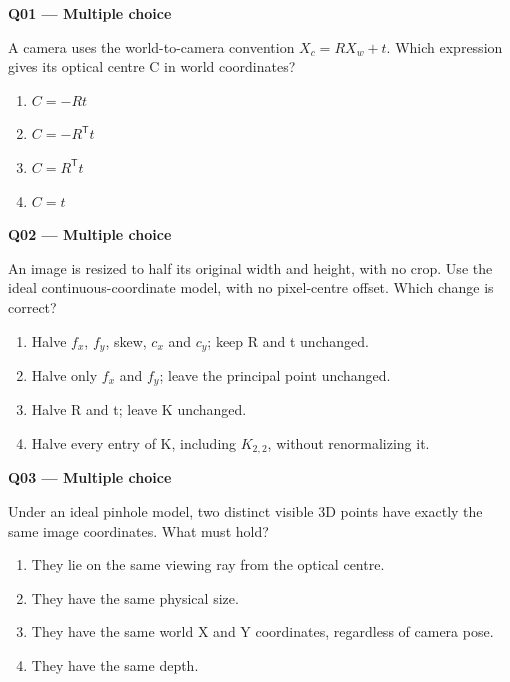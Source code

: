\documentclass[11pt,a4paper]{article}
\begin{document}
\begin{minipage}{\linewidth}
\textbf{Q01 — Multiple choice}\par\smallskip
A camera uses the world-to-camera convention \(X_c = R X_w + t\). Which expression gives its optical centre C in world coordinates?
\begin{enumerate}[label=\textbf{\Alph*.}]
\item \(C=-R t\)
\item \(C=-R^{\mathsf T}t\)
\item \(C=R^{\mathsf T}t\)
\item \(C=t\)
\end{enumerate}
\end{minipage}
\par\vspace{12pt}
\begin{minipage}{\linewidth}
\textbf{Q02 — Multiple choice}\par\smallskip
An image is resized to half its original width and height,\allowbreak{} with no crop. Use the ideal continuous-coordinate model,\allowbreak{} with no pixel-centre offset. Which change is correct?
\begin{enumerate}[label=\textbf{\Alph*.}]
\item Halve \(f_x\),\allowbreak{} \(f_y\),\allowbreak{} skew,\allowbreak{} \(c_x\) and \(c_y\); keep R and t unchanged.
\item Halve only \(f_x\) and \(f_y\); leave the principal point unchanged.
\item Halve R and t; leave K unchanged.
\item Halve every entry of K,\allowbreak{} including \(K_{2,2}\),\allowbreak{} without renormalizing it.
\end{enumerate}
\end{minipage}
\par\vspace{12pt}
\begin{minipage}{\linewidth}
\textbf{Q03 — Multiple choice}\par\smallskip
Under an ideal pinhole model,\allowbreak{} two distinct visible 3D points have exactly the same image coordinates. What must hold?
\begin{enumerate}[label=\textbf{\Alph*.}]
\item They lie on the same viewing ray from the optical centre.
\item They have the same physical size.
\item They have the same world X and Y coordinates,\allowbreak{} regardless of camera pose.
\item They have the same depth.
\end{enumerate}
\end{minipage}
\end{document}
